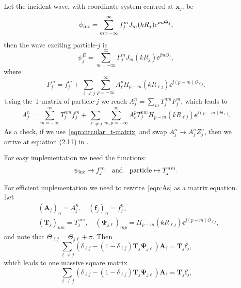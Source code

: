 \documentclass[ 12pt, a4paper]{article}
\renewcommand{\vec}[1]{\boldsymbol{#1}}
\begin{document}
Let the incident wave, with coordinate system centred at $\vec x_j$, be
\begin{equation}
  \label{eqn:incident}
  \psi_{\mathrm{inc}} = \sum_{m=-\infty}^\infty f^m_j J_{m}(k R_j) \mathrm{e}^{\mathrm{i} m \Theta_j},
\end{equation}
then the wave exciting particle-$j$ is
\begin{equation}
  \label{eqn:exciter}
  \psi_j^E = \sum_{m=-\infty}^\infty F^m_j J_m(k R_j) \ee^{\ii m \Theta_j},
\end{equation}
where
\begin{equation}
  F^m_j = f^m_j + \sum_{\ell\not = j} \sum_{p=-\infty}^\infty A_\ell^p H_{p-m}(k R_{\ell j})\ee^{\ii(p-m)\Theta_{\ell j}}.
\end{equation}
Using the T-matrix of particle-$j$ we reach $A_j^n = \sum_m T^{nm}_j F^m_j$, which leads to
\begin{equation}
A_j^n  = \sum_{m=-\infty}^\infty T^{nm}_j f^m_j + \sum_{\ell\not = j} \sum_{m,p=-\infty}^\infty A_\ell^p T^{nm}_j H_{p-m}(k R_{\ell j})\ee^{\ii(p-m)\Theta_{\ell j}}.
\label{eqn:As}
\end{equation}
As a check, if we use~\eqref{eqn:circular_t-matrix} and swap $A_j^n \to A_j^n Z^n_j$, then we arrive at equation (2.11) in \cite{gower_reflection_2017}.

For easy implementation we need the functions:
\[
\psi_{\mathrm{inc}} \mapsto f^m_j \quad \text{and} \quad \text{particle} \mapsto T^{nm}_j.
\]

For efficient implementation we need to rewrite~\eqref{eqn:As} as a matrix equation. Let
\begin{align}
  &(\vec A_j)_n =  A_j^n, \quad (\vec f_j)_n =  f_j^n,
  \\
  &(\vec T_j)_{nm} = T^{nm}_j, \quad (\vec \Psi_{j \ell})_{mp} =  H_{p-m}(k R_{\ell j})\ee^{\ii(p-m)\Theta_{\ell j}},
\end{align}
and note that $\Theta_{\ell j} = \Theta_{j \ell } + \pi$. Then
\begin{equation}
 \sum_{\ell\not = j}(\delta_{\ell j} -  (1 -\delta_{\ell j}) \vec T_j \vec \Psi_{j \ell}) \vec A_\ell  = \vec T_j \vec f_j,
\end{equation}
which leads to one massive square matrix
\begin{equation}
 \sum_{\ell\not = j}(\delta_{\ell j} -  (1 -\delta_{\ell j}) \vec T_j \vec \Psi_{j \ell}) \vec A_\ell  = \vec T_j \vec f_j,
\end{equation}


\printbibliography
\end{document}
